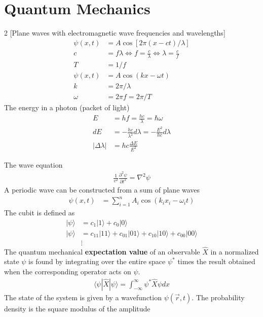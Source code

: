 \chapter{Quantum Mechanics}
\thispagestyle{fancy}
\begin{multicols}{2}
[Plane waves with electromagnetic wave frequencies and wavelengths]
	\noindent
	\begin{align}
		\psi(x,t) &=A\cos[2\pi(x-ct)/\lambda] \\
		c &= f \lambda \Longleftrightarrow f = \frac{c}{\lambda} \Longleftrightarrow \lambda = \frac{c}{f} \\
		T &=1/f \\
		\psi(x,t) &= A \cos(kx-\omega t) \\
		k &= 2\pi /\lambda \\
		\omega &= 2\pi f = 2 \pi /T
	\end{align}
	The energy in a photon (packet of light)
	\begin{align}
		E &=h f  = \frac{hc}{\lambda} = \hbar \omega \\
		dE &= -\frac{hc}{\lambda^2}d\lambda=-\frac{E^2}{hc}d\lambda \\ |\Delta \lambda | &= hc\frac{\Delta E}{E^2}
	\end{align}
\end{multicols}
The wave equation
\begin{align}
	\frac{1}{v^2}\frac{\partial^2 \psi}{\partial t^2} = \nabla^2\psi
\end{align}
A periodic wave can be constructed from a sum of plane waves
\begin{align}
	\psi(x,t) &= \sum_{i=1}^{n} A_i \cos(k_ix_i-\omega_i t) 
\end{align}
The cubit is defined as
\begin{align}
	|\psi\rangle &= c_1|1\rangle + c_0|0\rangle \\
	|\psi\rangle &= c_{11}|11\rangle+c_{01}|01\rangle+c_{10}|10\rangle+c_{00}|00\rangle \\
	&\vdots \nonumber
\end{align}
The quantum mechanical \textbf{expectation value} of an observable $\hat{X}$ in a normalized state $\psi$ is found by integrating over the entire space $\psi^*$ times the result obtained when the corresponding operator  acts on $\psi$. 
\begin{align}
	\langle \psi | \hat{X} | \psi \rangle = \int_{-\infty}^{\infty}\psi^* \hat{X}\psi dx
\end{align}
The state of the system is given by a wavefunction $\psi(\vec{r},t)$.  The probability density is the square modulus of the amplitude
